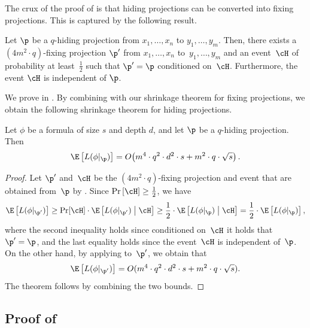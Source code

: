 \documentclass{toc}
\begin{document}
The crux of the proof of  is that hiding projections
can be converted into fixing projections. This is captured by the
following result. 
\begin{lemma}
\label{lemma:hiding-to-fixing}Let $\p$ be a $q$-hiding projection from
$x_{1},\ldots,x_{n}$ to $y_{1},\ldots,y_{m}$. Then, there exists
a $(4m^{2}\cdot q)$-fixing projection $\p'$ from $x_{1},\ldots,x_{n}$
to~$y_{1},\ldots,y_{m}$ and an event~$\cH$ of probability at least~$\frac{1}{2}$
such that $\p'=\p$ conditioned on~$\cH$. Furthermore, the event
$\cH$ is independent of $\p$.
\end{lemma}

We prove  in .
By combining  with our shrinkage theorem for
fixing projections, we obtain the following shrinkage theorem for
hiding projections. 
\begin{restated}{}
Let $\phi$ be a formula of size $s$ and depth $d$, and let $\p$
be a $q$-hiding projection. Then 
\[
\E\left[L(\phi|_{\p})\right]=O\!\left(m^{4}\cdot q^{2}\cdot d^{2}\cdot s+m^{2}\cdot q\cdot\sqrt{s}\right).
\]
\end{restated}

\begin{proof}
Let $\p'$ and~$\cH$ be the $(4m^{2}\cdot q)$-fixing projection
and event that are obtained from~$\p$ by .
Since $\Pr\left[\cH\right]\geq\frac{1}{2}$, we have 
\[
\E\left[L(\phi|_{\p'})\right]\geq\Pr\!\left[\cH\right]\cdot\E\left[L(\phi|_{\p'})\;\middle|\;\cH\right]\geq\frac{1}{2}\cdot\E\left[L(\phi|_{\p})\;\middle|\;\cH\right]=\frac{1}{2}\cdot\E\left[L(\phi|_{\p})\right],
\]
where the second inequality holds since conditioned on~$\cH$ it
holds that $\p'=\p$, and the last equality holds since the event~$\cH$
is independent of~$\p$. On the other hand, by applying 
to~$\p'$, we obtain that 
\[
\E\left[L(\phi|_{\p'})\right]=O(m^{4}\cdot q^{2}\cdot d^{2}\cdot s+m^{2}\cdot q\cdot\sqrt{s}).
\]
The theorem follows by combining the two bounds. 
\end{proof}

\subsection{\label{subsec:hiding-to-fixing}Proof of }
\end{document}
